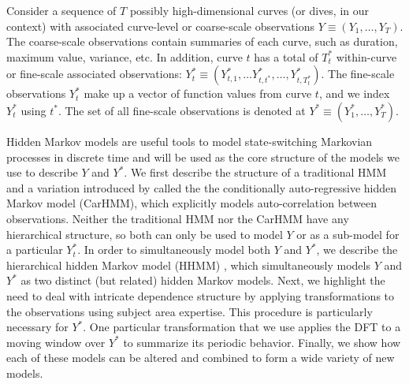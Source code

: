 
Consider a sequence of $T$ possibly high-dimensional curves (or dives, in our context) with associated curve-level or coarse-scale observations $Y \equiv \left(Y_1, \ldots, Y_T\right)$. The coarse-scale observations contain summaries of each curve, such as duration, maximum value, variance, etc. In addition, curve $t$ has a total of $T^*_t$ within-curve or fine-scale associated observations: $Y^*_t \equiv \left(Y^*_{t,1}, \ldots Y^*_{t,t^*}, \ldots, Y^*_{t,T^*_t}\right)$. The fine-scale observations $Y^*_t$ make up a vector of function values from curve $t$, and we index $Y^*_t$ using $t^*$. The set of all fine-scale observations is denoted at $Y^* \equiv \left(Y^*_1,\ldots,Y^*_T\right)$.

Hidden Markov models are useful tools to model state-switching Markovian processes in discrete time and will be used as the core structure of the models we use to describe $Y$ and $Y^*$. %
We first describe the structure of a traditional HMM and a variation introduced by \cite{Lawler:2019} called the the conditionally auto-regressive hidden Markov model (CarHMM), which explicitly models auto-correlation between observations. Neither the traditional HMM nor the CarHMM have any hierarchical structure, so both can only be used to model $Y$ or as a sub-model for a particular $Y^*_t$. In order to simultaneously model both $Y$ and $Y^*$, we describe the hierarchical hidden Markov model (HHMM) \citep{Barajas:2017,Adam:2019}, which simultaneously models $Y$ and $Y^*$ as two distinct (but related) hidden Markov models. Next, we highlight the need to deal with intricate dependence structure by applying transformations to the observations using subject area expertise. This procedure is particularly necessary for $Y^*$. One particular transformation that we use applies the DFT to a moving window over $Y^*$ to summarize its periodic behavior. Finally, we show how each of these models can be altered and combined to form a wide variety of new models.

